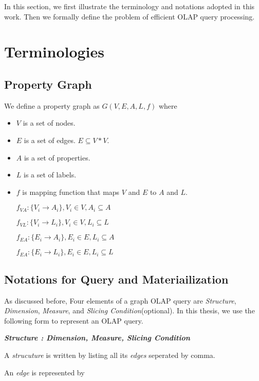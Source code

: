 In this section, we first illustrate the terminology and notations adopted in this work. Then we formally define the problem of efficient OLAP query processing. 

\section{Terminologies}
\subsection{Property Graph}
We define a property graph as $G(V, E, A, L, f)$ where
\begin{itemize} 
\item $V$ is a set of nodes. 
\item $E$ is a set of edges. $E \subseteq V * V$.
\item $A$ is a set of properties.
\item $L$ is a set of labels.
\item $f$ is mapping function that maps $V$ and $E$ to $A$ and $L$. 

$f_{VA}: \{V_{i} \rightarrow A_{i}\}, V_{i}\in V, A_{i} \subseteq A$ 

$f_{VL}: \{V_{i} \rightarrow L_{i}\}, V_{i}\in V, L_{i} \subseteq L$ 

$f_{EA}: \{E_{i} \rightarrow A_{i}\}, E_{i}\in E, L_{i} \subseteq A$ 

$f_{EA}: \{E_{i} \rightarrow L_{i}\}, E_{i}\in E, L_{i} \subseteq L$ 

\end{itemize} 

\subsection{Notations for Query and Materiailization}

As discussed before, Four elements of a graph OLAP query are \textit{Structure}, \textit{Dimension}, \textit{Measure}, and \textit{Slicing Condition}(optional). In this thesis, we use the following form to represent an OLAP query.

\textbf{\textit{Structure : Dimension, Measure, Slicing Condition}}

A \textit{strucuture} is written by listing all its \textit{edges} seperated by comma.

An \textit{edge} is represented by 

